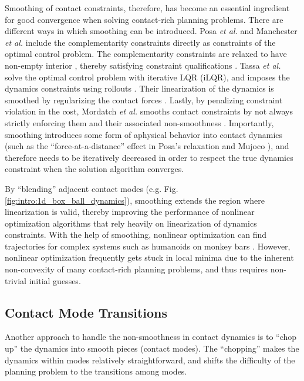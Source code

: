 Smoothing of contact constraints, therefore, has become an essential ingredient for good convergence when solving contact-rich planning problems. There are different ways in which smoothing can be introduced. Posa \textit{et al.}  and Manchester \textit{et al.} include the complementarity constraints directly as constraints of the optimal control problem. The complementarity constraints are relaxed to have non-empty interior \cite{posa2014direct, manchester2020variational}, thereby satisfying constraint qualifications \cite[]{nocedal1999numerical}. Tassa \textit{et al.} solve the optimal control problem with iterative LQR (iLQR), and imposes the dynamics constraints using rollouts \cite{tassa2012synthesis}. Their linearization of the dynamics is smoothed by regularizing the contact forces \cite{todorov2012mujoco}. Lastly, by penalizing constraint violation in the cost, Mordatch \textit{et al.} smooths contact constraints by not always strictly enforcing them and their associated non-smoothness \cite{mordatch2012contact}. Importantly, smoothing introduces some form of aphysical behavior into contact dynamics (such as the ``force-at-a-distance'' effect in Posa's relaxation \cite{posa2014direct} and Mujoco \cite{kolbert2016experimental}), and therefore needs to be iteratively decreased in order to respect the true dynamics constraint when the solution algorithm converges.

By ``blending'' adjacent contact modes (e.g. Fig. \ref{fig:intro:1d_box_ball_dynamics}), smoothing extends the region where linearization is valid, thereby improving the performance of nonlinear optimization algorithms that rely heavily on linearization of dynamics constraints. With the help of smoothing, nonlinear optimization can find trajectories for complex systems such as humanoids on monkey bars \cite{dai2014whole}. However, nonlinear optimization frequently gets stuck in local minima due to the inherent non-convexity of many contact-rich planning problems, and thus requires non-trivial initial guesses.

\subsection{Contact Mode Transitions}
Another approach to handle the non-smoothness in contact dynamics is to ``chop up'' the dynamics into smooth pieces (contact modes). The ``chopping'' makes the dynamics within modes relatively straightforward, and shifts the difficulty of the planning problem to the transitions among modes. 

